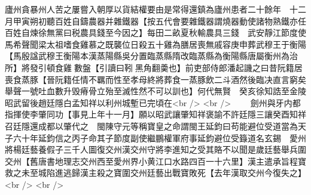 廬州貪暴州人苦之屢嘗入朝厚以貨結權要由是常得還鎮為廬州患者二十餘年　十二月甲寅朔初聽百姓自鑄農器并雜鐵器【按五代會要雜鐵器謂燒器動使諸物熟鐵亦任百姓自煉徐無黨曰税農具錢至今因之】每田二畝夏秋輸農具三錢　武安靜江節度使馬希聲聞梁太祖嗜食雞慕之既襲位日殺五十雞為膳居喪無戚容庚申葬武穆王于衡陽【馬殷諡武穆王衡陽本漢蒸陽縣吳分置臨蒸縣隋改臨蒸縣為衡陽縣唐屬衡州為治所】將發引頓食雞數盤【引讀曰靷黑角翻羮也】前吏部侍郎潘起譏之曰昔阮籍居喪食蒸豚【晉阮籍任情不羈而性至孝母終將葬食一蒸豚飲二斗酒然後臨决直言窮矣舉聲一號吐血數升毁瘠骨立殆至滅性然不可以訓也】何代無賢　癸亥徐知誥至金陵昭武留後趙廷隱白孟知祥以利州城塹已完頃在<br />
<br />
　　劍州與牙内都指揮使李肇同功【事見上年十一月】願以昭武讓肇知祥褒諭不許廷隱三讓癸酉知祥召廷隱還成都以肇代之　閩陳守元等稱寶皇之命謂閩王延鈞曰苟能避位受道當為天子六十年延鈞信之丙子命其子節度副使繼鵬權軍府事延鈞避位受籙道名玄錫　愛州將楊廷藝養假子三千人圖復交州漢交州守將李進知之受其賂不以聞是歲廷藝舉兵圍交州【舊唐書地理志交州西至愛州界小黄江口水路四百一十六里】漢主遣承旨程寶救之未至城陷進逃歸漢主殺之寶圍交州廷藝出戰寶敗死【去年漢取交州今復失之】<br />
<br />

